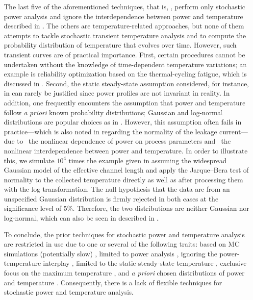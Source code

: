 The last five of the aforementioned techniques, that is, \cite{bhardwaj2006,
vrudhula2006, ghanta2006, bhardwaj2008, shen2009}, perform only stochastic power
analysis and ignore the interdependence between power and temperature described
in . The others are temperature-related
approaches, but none of them attempts to tackle stochastic transient temperature
analysis and to compute the probability distribution of temperature that evolves
over time. However, such transient curves are of practical importance. First,
certain procedures cannot be undertaken without the knowledge of time-dependent
temperature variations; an example is reliability optimization based on the
thermal-cycling fatigue, which is discussed in
. Second, the static steady-state assumption
considered, for instance, in \cite{huang2009a, juan2011, juan2012, lee2013} can
rarely be justified since power profiles are not invariant in reality. In
addition, one frequently encounters the assumption that power and temperature
follow \emph{a priori} known probability distributions; Gaussian and log-normal
distributions are popular choices as in \cite{bhardwaj2006, srivastava2010,
juan2012}. However, this assumption often fails in practice---which is also
noted in \cite{juan2012} regarding the normality of the leakage current---due to
\one~the nonlinear dependence of power on process parameters and \two~the
nonlinear interdependence between power and temperature. In order to illustrate
this, we simulate $10^4$ times the example given in 
assuming the widespread Gaussian model of the effective channel length and apply
the Jarque--Bera test of normality to the collected temperature directly as well
as after processing them with the log transformation. The null hypothesis that
the data are from an unspecified Gaussian distribution is firmly rejected in
both cases at the significance level of 5\%. Therefore, the two distributions
are neither Gaussian nor log-normal, which can also be seen in
 described in .

To conclude, the prior techniques for stochastic power and temperature analysis
are restricted in use due to one or several of the following traits: based on
\ac{MC} simulations (potentially slow) \cite{chandra2010}, limited to power
analysis \cite{bhardwaj2006, ghanta2006, vrudhula2006, bhardwaj2008, shen2009,
chandra2010}, ignoring the power-temperature interplay \cite{bhardwaj2006,
ghanta2006, vrudhula2006, bhardwaj2008, huang2009a, shen2009}, limited to the
static steady-state temperature \cite{huang2009a, juan2011, juan2012, lee2013},
exclusive focus on the maximum temperature \cite{juan2011}, and \emph{a priori}
chosen distributions of power and temperature \cite{bhardwaj2006,
srivastava2010, juan2012}. Consequently, there is a lack of flexible techniques
for stochastic power and temperature analysis.

